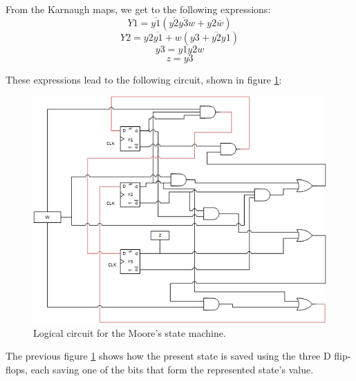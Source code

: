   
    \begin{center}
        \begin{Karnaughvuit}
        \end{Karnaughvuit}
    \end{center}

From the Karnaugh maps, we get to the following expressions:
$$Y1 = \overline{y1} (\overline{y2}   \overline{y3}  w + y2 \overline{w})$$
$$Y2 = y2  \overline{y1} + w (y3 + \overline{y2}  y1)$$
$$y3 = y1  y2  w $$
$$z = y3 $$

These expressions lead to the following circuit, shown in figure \ref{ej2circuit}:

\begin{figure}[H]
\centering
\includegraphics[scale=0.8]{../Exercise2/ej2circuit}
\caption{\color{cyan}Logical circuit for the Moore's state machine.}
\label{ej2circuit}
\end{figure}

The previous figure  \ref {ej2circuit} shows how the present state is saved using the three D flip-flops, each saving one of the bits that form the represented state's value.

